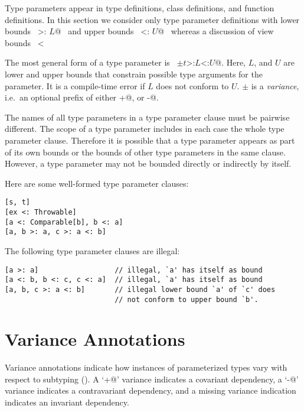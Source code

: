 Type parameters appear in type definitions, class definitions, and
function definitions.  In this section we consider only type parameter
definitions with lower bounds ~\lstinline@>: $L$@~ and upper bounds
~\lstinline@<: $U$@~ whereas a discussion of view bounds
~\lstinline@<% $U$@~ is deferred to Section~\ref{sec:view-bounds}.

The most general form of a type parameter is ~\lstinline@$\pm t$>:$L$<:$U$@.  
Here, $L$, and $U$ are lower and upper bounds that
constrain possible type arguments for the parameter.  It is a
compile-time error if $L$ does not conform to $U$. $\pm$ is a {\em
variance}, i.e.\ an optional prefix of either \lstinline@+@, or
\lstinline@-@.

The names of all type parameters in a type parameter clause must be
pairwise different.  The scope of a type parameter includes in each
case the whole type parameter clause. Therefore it is possible that a
type parameter appears as part of its own bounds or the bounds of
other type parameters in the same clause.  However, a type parameter
may not be bounded directly or indirectly by itself.

\example Here are some well-formed type parameter clauses:
\begin{lstlisting}
[s, t]
[ex <: Throwable]
[a <: Comparable[b], b <: a]
[a, b >: a, c >: a <: b]
\end{lstlisting}
The following type parameter clauses are illegal:
\begin{lstlisting}
[a >: a]                  // illegal, `a' has itself as bound
[a <: b, b <: c, c <: a]  // illegal, `a' has itself as bound
[a, b, c >: a <: b]       // illegal lower bound `a' of `c' does
                          // not conform to upper bound `b'.
\end{lstlisting}

\section{Variance Annotations}\label{sec:variances}

Variance annotations indicate how instances of parameterized types
vary with respect to subtyping ().  A
`\lstinline@+@' variance indicates a covariant dependency, a
`\lstinline@-@' variance indicates a contravariant dependency, and a
missing variance indication indicates an invariant dependency.

